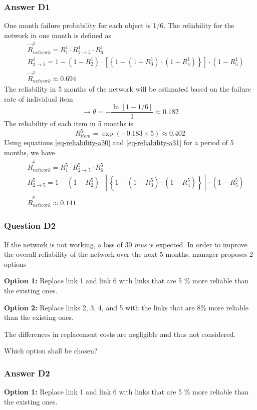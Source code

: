 \subsubsection{Answer D1}
One month failure probability for each object is 1/6. The reliability for the
network in one month is defined as
\begin{eqnarray}
&& \vec R_{network}^1 = R_1^1 \cdot R_{2 \to 5}^1 \cdot R_6^1
\label{eq-reliability-a30} \\
&& R_{2 \to 5}^1 = 1 - (1 - R_2^1) \cdot \left[ {\left\{ {1 - (1 - R_3^1) \cdot (1
- R_4^1)} \right\}} \right] \cdot (1 - R_5^1)
\label{eq-reliability-a31} \\
&& \vec R_{network}^1 \approx 0.694 \nonumber
\end{eqnarray}
The reliability in 5 months of the network will be estimated based on the
failure rate of individual item
\[
\to \theta  =  - \frac{{\ln [1 - 1/6]}}{1} \approx 0.182
\]
The reliability of each item in 5 months is
\[
R_{item}^5 = \exp ( - 0.183 \times 5) \approx 0.402
\]
Using equations \eqref{eq-reliability-a30} and \eqref{eq-reliability-a31} for a period of 5 months, we have
\begin{eqnarray}
&& \vec R_{network}^5 = R_1^5 \cdot R_{2 \to 5}^5 \cdot R_6^5
\label{eq-reliability-a34} \\
&& R_{2 \to 5}^5 = 1 - (1 - R_2^5) \cdot \left[ {\left\{ {1 - (1 - R_3^5) \cdot (1
- R_4^5)} \right\}} \right] \cdot (1 - R_5^5)
\label{eq-reliability-a35}\\
&& \vec R_{network}^5 \approx 0.141 \nonumber
\end{eqnarray}
\subsubsection{Question D2}
If the network is not working, a loss of 30 \textit{mus} is expected. In order
to improve the overall reliability of the network over the next 5 months, manager
proposes 2 options

\textbf{Option 1:} Replace link 1 and link 6 with links that are 5 \% more
reliable than the existing ones.

\textbf{Option 2:} Replace links 2, 3, 4, and 5 with the links that are 8\% more
reliable than the existing ones.

The differences in replacement costs are negligible and thus not considered.

Which option shall be chosen?
\subsubsection{Answer D2}
\textbf{Option 1:} Replace link 1 and link 6 with links that are 5 \% more
reliable than the existing ones.

